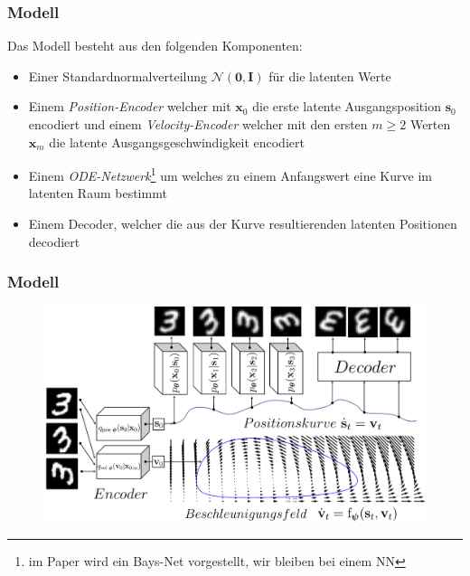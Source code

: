 \begin{frame}
\frametitle{Modell}
Das Modell besteht aus den folgenden Komponenten:
\begin{itemize}
	\item Einer Standardnormalverteilung $\mathcal{N}(\mathbf{0},\mathbf{I})$ für die latenten Werte
	\item Einem \emph{Position-Encoder} welcher mit $\mathbf{x}_{0}$ die erste latente Ausgangsposition $\mathbf{s}_{0}$ encodiert und einem \emph{Velocity-Encoder} welcher mit den ersten $m\geq2$ Werten $\mathbf{x}_{m}$ die latente Ausgangsgeschwindigkeit encodiert\\
    \item Einem \emph{ODE-Netzwerk}\footnote{im Paper wird ein Bays-Net vorgestellt, wir bleiben bei einem NN} um welches zu einem Anfangswert eine Kurve im latenten Raum bestimmt\\
    \item Einem Decoder, welcher die aus der Kurve resultierenden latenten Positionen decodiert
\end{itemize}
\end{frame}




\begin{frame}
    \frametitle{Modell}
    	\begin{figure}[h!]
    	\centering
    	\includegraphics[scale=0.36]{Bilder/ODE2VAE_ODE_Net}
    \end{figure}
\end{frame}




